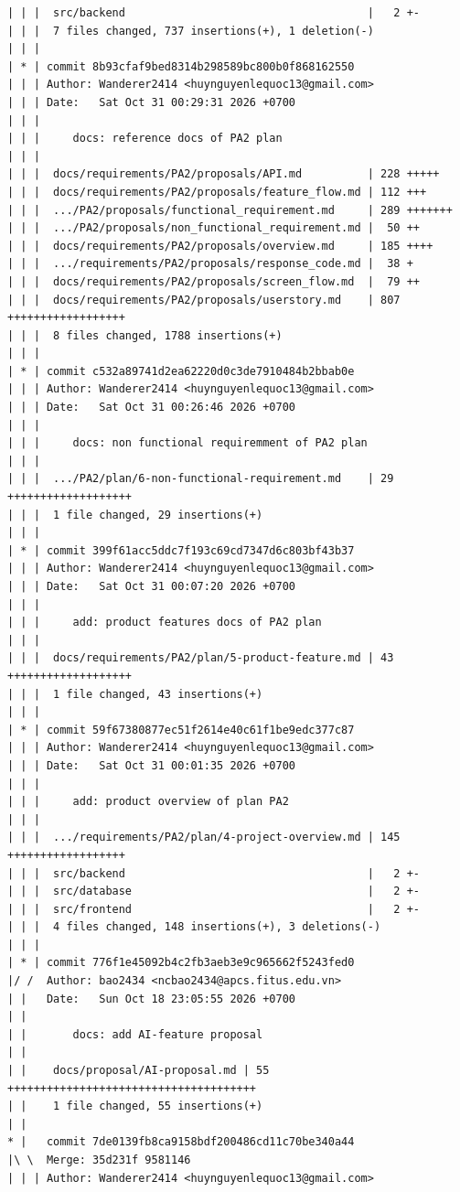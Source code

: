 \documentclass[12pt]{article}
\begin{document}
\begin{lstlisting}[numbers=none,breaklines=true]
| | |  src/backend                                     |   2 +-
| | |  7 files changed, 737 insertions(+), 1 deletion(-)
| | |
| * | commit 8b93cfaf9bed8314b298589bc800b0f868162550
| | | Author: Wanderer2414 <huynguyenlequoc13@gmail.com>
| | | Date:   Sat Oct 31 00:29:31 2026 +0700
| | |
| | |     docs: reference docs of PA2 plan
| | |
| | |  docs/requirements/PA2/proposals/API.md          | 228 +++++
| | |  docs/requirements/PA2/proposals/feature_flow.md | 112 +++
| | |  .../PA2/proposals/functional_requirement.md     | 289 +++++++
| | |  .../PA2/proposals/non_functional_requirement.md |  50 ++
| | |  docs/requirements/PA2/proposals/overview.md     | 185 ++++
| | |  .../requirements/PA2/proposals/response_code.md |  38 +
| | |  docs/requirements/PA2/proposals/screen_flow.md  |  79 ++
| | |  docs/requirements/PA2/proposals/userstory.md    | 807 ++++++++++++++++++
| | |  8 files changed, 1788 insertions(+)
| | |
| * | commit c532a89741d2ea62220d0c3de7910484b2bbab0e
| | | Author: Wanderer2414 <huynguyenlequoc13@gmail.com>
| | | Date:   Sat Oct 31 00:26:46 2026 +0700
| | |
| | |     docs: non functional requiremment of PA2 plan
| | |
| | |  .../PA2/plan/6-non-functional-requirement.md    | 29 +++++++++++++++++++
| | |  1 file changed, 29 insertions(+)
| | |
| * | commit 399f61acc5ddc7f193c69cd7347d6c803bf43b37
| | | Author: Wanderer2414 <huynguyenlequoc13@gmail.com>
| | | Date:   Sat Oct 31 00:07:20 2026 +0700
| | |
| | |     add: product features docs of PA2 plan
| | |
| | |  docs/requirements/PA2/plan/5-product-feature.md | 43 +++++++++++++++++++
| | |  1 file changed, 43 insertions(+)
| | |
| * | commit 59f67380877ec51f2614e40c61f1be9edc377c87
| | | Author: Wanderer2414 <huynguyenlequoc13@gmail.com>
| | | Date:   Sat Oct 31 00:01:35 2026 +0700
| | |
| | |     add: product overview of plan PA2
| | |
| | |  .../requirements/PA2/plan/4-project-overview.md | 145 ++++++++++++++++++
| | |  src/backend                                     |   2 +-
| | |  src/database                                    |   2 +-
| | |  src/frontend                                    |   2 +-
| | |  4 files changed, 148 insertions(+), 3 deletions(-)
| | |
| * | commit 776f1e45092b4c2fb3aeb3e9c965662f5243fed0
|/ /  Author: bao2434 <ncbao2434@apcs.fitus.edu.vn>
| |   Date:   Sun Oct 18 23:05:55 2026 +0700
| |
| |       docs: add AI-feature proposal
| |
| |    docs/proposal/AI-proposal.md | 55 ++++++++++++++++++++++++++++++++++++++
| |    1 file changed, 55 insertions(+)
| |
* |   commit 7de0139fb8ca9158bdf200486cd11c70be340a44
|\ \  Merge: 35d231f 9581146
| | | Author: Wanderer2414 <huynguyenlequoc13@gmail.com>

\end{lstlisting}
\end{document}
